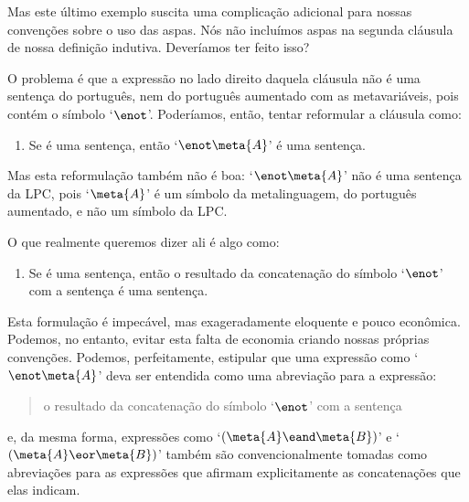 Mas este último exemplo suscita uma complicação adicional para nossas convenções sobre o uso das aspas.
Nós não incluímos aspas na segunda cláusula de nossa definição indutiva. Deveríamos ter feito isso?

O problema é que a expressão no lado direito daquela cláusula não é uma sentença do português, nem do português aumentado com as metavariáveis, pois contém o símbolo `$\enot$'.
Poderíamos, então, tentar reformular a cláusula como:
	\begin{enumerate}
		\item[2$'$.] Se  é uma sentença, então `$\enot \meta{A}$' é uma sentença.
	\end{enumerate}
Mas esta reformulação também não é boa:
`$\enot\meta{A}$' não é uma sentença da LPC, pois `$\meta{A}$' é um símbolo da metalinguagem, do português aumentado, e não um símbolo da LPC.

O que realmente queremos dizer ali é algo como:
	\begin{enumerate}
		\item[2$''$.] Se  é uma sentença, então o resultado da concatenação do símbolo `$\enot$' com a sentença  é uma sentença.
	\end{enumerate}
Esta formulação é impecável, mas exageradamente eloquente e pouco econômica.
Podemos, no entanto, evitar esta falta de economia criando nossas próprias convenções.
Podemos, perfeitamente, estipular que uma expressão como `$\enot\meta{A}$' deva ser entendida como uma abreviação para a expressão:
\begin{quote}
	o resultado da concatenação do símbolo `$\enot$' com a sentença 
\end{quote}
e, da mesma forma, expressões como `$(\meta{A} \eand \meta{B})$' e `$(\meta{A} \eor \meta{B})$' também são convencionalmente tomadas como abreviações para as expressões que afirmam explicitamente as concatenações que elas indicam.


